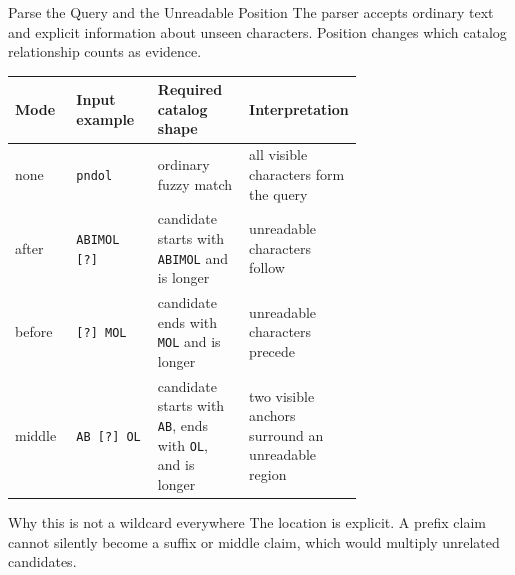 \documentclass[aspectratio=169,10pt]{beamer}
\newcommand{\code}[1]{\texttt{#1}}
\begin{document}
\begin{frame}{Parse the Query and the Unreadable Position}
\small
The parser accepts ordinary text and explicit information about unseen
characters. Position changes which catalog relationship counts as evidence.

\begin{table}
\centering
\begin{tabularx}{\linewidth}{@{}L{0.18\linewidth}L{0.24\linewidth}L{0.27\linewidth}Y@{}}
\toprule
\textbf{Mode} & \textbf{Input example} & \textbf{Required catalog shape} & \textbf{Interpretation} \\
\midrule
none & \code{pndol} & ordinary fuzzy match & all visible characters form the query \\
after & \code{ABIMOL [?]} & candidate starts with \code{ABIMOL} and is longer & unreadable characters follow \\
before & \code{[?] MOL} & candidate ends with \code{MOL} and is longer & unreadable characters precede \\
middle & \code{AB [?] OL} & candidate starts with \code{AB}, ends with \code{OL}, and is longer & two visible anchors surround an unreadable region \\
\bottomrule
\end{tabularx}
\end{table}

\vspace{1mm}
\begin{alertblock}{Why this is not a wildcard everywhere}
\small
The location is explicit. A prefix claim cannot silently become a suffix or
middle claim, which would multiply unrelated candidates.
\end{alertblock}
\end{frame}
\end{document}
